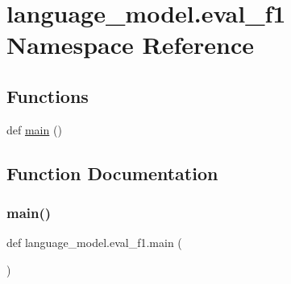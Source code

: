 \hypertarget{namespacelanguage__model_1_1eval__f1}{}\section{language\+\_\+model.\+eval\+\_\+f1 Namespace Reference}
\label{namespacelanguage__model_1_1eval__f1}
\subsection*{Functions}
\begin{DoxyCompactItemize}
\item 
def \hyperlink{namespacelanguage__model_1_1eval__f1_a88a3c5c1d47606053bd1b66ab08daf0e}{main} ()
\end{DoxyCompactItemize}


\subsection{Function Documentation}
\mbox{\label{namespacelanguage__model_1_1eval__f1_a88a3c5c1d47606053bd1b66ab08daf0e}} 
\subsubsection{\texorpdfstring{main()}{main()}}
{\footnotesize\ttfamily def language\+\_\+model.\+eval\+\_\+f1.\+main (\begin{DoxyParamCaption}{ }\end{DoxyParamCaption})}

